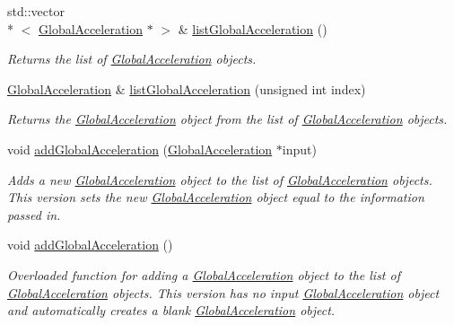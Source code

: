\begin{DoxyCompactItemize}
std\-::vector\\*
$<$ \hyperlink{classosea_1_1ofreq_1_1_global_acceleration}{Global\-Acceleration} $\ast$ $>$ \& \hyperlink{classosea_1_1ofreq_1_1_outputs_body_ad840585a6d2ccb29085477408d877299}{list\-Global\-Acceleration} ()
\begin{DoxyCompactList}\small\item\em Returns the list of \hyperlink{classosea_1_1ofreq_1_1_global_acceleration}{Global\-Acceleration} objects. \end{DoxyCompactList}\item 
\hyperlink{classosea_1_1ofreq_1_1_global_acceleration}{Global\-Acceleration} \& \hyperlink{classosea_1_1ofreq_1_1_outputs_body_a76c051c2dd085912f7803ad89017fbcd}{list\-Global\-Acceleration} (unsigned int index)
\begin{DoxyCompactList}\small\item\em Returns the \hyperlink{classosea_1_1ofreq_1_1_global_acceleration}{Global\-Acceleration} object from the list of \hyperlink{classosea_1_1ofreq_1_1_global_acceleration}{Global\-Acceleration} objects. \end{DoxyCompactList}\item 
void \hyperlink{classosea_1_1ofreq_1_1_outputs_body_aa726a0eca1105d15bd23fd1cb51ecc67}{add\-Global\-Acceleration} (\hyperlink{classosea_1_1ofreq_1_1_global_acceleration}{Global\-Acceleration} $\ast$input)
\begin{DoxyCompactList}\small\item\em Adds a new \hyperlink{classosea_1_1ofreq_1_1_global_acceleration}{Global\-Acceleration} object to the list of \hyperlink{classosea_1_1ofreq_1_1_global_acceleration}{Global\-Acceleration} objects. This version sets the new \hyperlink{classosea_1_1ofreq_1_1_global_acceleration}{Global\-Acceleration} object equal to the information passed in. \end{DoxyCompactList}\item 
void \hyperlink{classosea_1_1ofreq_1_1_outputs_body_a3205155873f5db270a71377e5ff80bb4}{add\-Global\-Acceleration} ()
\begin{DoxyCompactList}\small\item\em Overloaded function for adding a \hyperlink{classosea_1_1ofreq_1_1_global_acceleration}{Global\-Acceleration} object to the list of \hyperlink{classosea_1_1ofreq_1_1_global_acceleration}{Global\-Acceleration} objects. This version has no input \hyperlink{classosea_1_1ofreq_1_1_global_acceleration}{Global\-Acceleration} object and automatically creates a blank \hyperlink{classosea_1_1ofreq_1_1_global_acceleration}{Global\-Acceleration} object. \end{DoxyCompactList}\item 

\end{DoxyCompactItemize}
